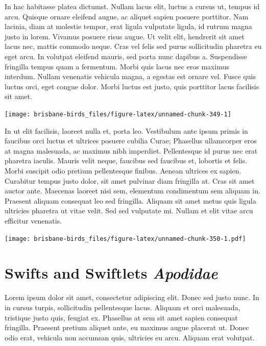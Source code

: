 \documentclass[]{book}
\let\origfigure\figure
\let\endorigfigure\endfigure
\renewenvironment{figure}[1][2] {
  \expandafter\origfigure\expandafter[H]
} {
  \endorigfigure
}
\begin{document}
In hac habitasse platea dictumst. Nullam lacus elit, luctus a cursus ut,
tempus id arcu. Quisque ornare eleifend augue, ac aliquet sapien posuere
porttitor. Nam lacinia, diam at molestie tempor, erat ligula vulputate
ligula, id rutrum magna justo in lorem. Vivamus posuere risus augue. Ut
velit elit, hendrerit sit amet lacus nec, mattis commodo neque. Cras vel
felis sed purus sollicitudin pharetra eu eget arcu. In volutpat eleifend
mauris, sed porta nunc dapibus a. Suspendisse fringilla tempus quam a
fermentum. Morbi quis lacus nec eros maximus interdum. Nullam venenatis
vehicula magna, a egestas est ornare vel. Fusce quis luctus orci, eget
congue dolor. Morbi luctus est justo, quis porttitor lacus facilisis sit
amet.

\begin{figure}
\texttt{[image: brisbane-birds\_files/figure-latex/unnamed-chunk-349-1]} \caption{insert figure caption}\label{fig:unnamed-chunk-349}
\end{figure}

In ut elit facilisis, laoreet nulla et, porta leo. Vestibulum ante ipsum
primis in faucibus orci luctus et ultrices posuere cubilia Curae;
Phasellus ullamcorper eros at magna malesuada, ac maximus nibh
imperdiet. Pellentesque id purus nec erat pharetra iaculis. Mauris velit
neque, faucibus sed faucibus et, lobortis et felis. Morbi suscipit odio
pretium pellentesque finibus. Aenean ultrices ex sapien. Curabitur
tempus justo dolor, sit amet pulvinar diam fringilla at. Cras sit amet
auctor ante. Maecenas laoreet nisi sem, elementum condimentum sem
aliquam in. Praesent aliquam consequat leo sed fringilla. Aliquam sit
amet metus quis ligula ultricies pharetra ut vitae velit. Sed sed
vulputate mi. Nullam et elit vitae arcu efficitur venenatis.

\begin{figure}
\centering
\texttt{[image: brisbane-birds\_files/figure-latex/unnamed-chunk-350-1.pdf]}
\caption{\label{fig:unnamed-chunk-350}insert figure caption}
\end{figure}

\chapter{\texorpdfstring{Swifts and Swiftlets
\emph{Apodidae}}{Swifts and Swiftlets Apodidae}}\label{swifts-and-swiftlets-apodidae}

Lorem ipsum dolor sit amet, consectetur adipiscing elit. Donec sed justo
nunc. In in cursus turpis, sollicitudin pellentesque lacus. Aliquam et
orci malesuada, tristique justo quis, feugiat ex. Phasellus at sem sit
amet sapien consequat fringilla. Praesent pretium aliquet ante, eu
maximus augue placerat ut. Donec odio erat, vehicula non accumsan quis,
ultricies eu arcu. Aliquam erat volutpat.
\end{document}
